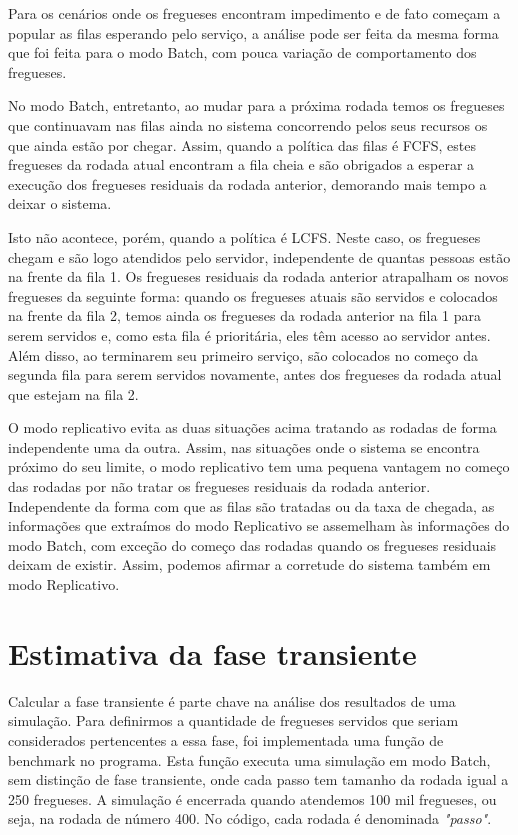 \documentclass[a4paper,10pt]{article}
\begin{document}
    Para os cenários onde os fregueses encontram impedimento e de fato começam a popular as filas esperando pelo serviço, a análise pode ser feita da mesma forma que foi feita para o modo Batch, com pouca variação de comportamento dos fregueses.

    No modo Batch, entretanto, ao mudar para a próxima rodada temos os fregueses que continuavam nas filas ainda no sistema concorrendo pelos seus recursos os que ainda estão por chegar. Assim, quando a política das filas é FCFS, estes fregueses da rodada atual encontram a fila cheia e são obrigados a esperar a execução dos fregueses residuais da rodada anterior, demorando mais tempo a deixar o sistema.

    Isto não acontece, porém, quando a política é LCFS. Neste caso, os fregueses chegam e são logo atendidos pelo servidor, independente de quantas pessoas estão na frente da fila 1. Os fregueses residuais da rodada anterior atrapalham os novos fregueses da seguinte forma: quando os fregueses atuais são servidos e colocados na frente da fila 2, temos ainda os fregueses da rodada anterior na fila 1 para serem servidos e, como esta fila é prioritária,  eles têm acesso ao servidor antes. Além disso, ao terminarem seu primeiro serviço, são colocados no começo da segunda fila para serem servidos novamente, antes dos fregueses da rodada atual que estejam na fila 2.

    O modo replicativo evita as duas situações acima tratando as rodadas de forma independente uma da outra. Assim, nas situações onde o sistema se encontra próximo do seu limite, o modo replicativo tem uma pequena vantagem no começo das rodadas por não tratar os fregueses residuais da rodada anterior. Independente da forma com que as filas são tratadas ou da taxa de chegada, as informações que extraímos do modo Replicativo se assemelham às informações do modo Batch, com exceção do começo das rodadas quando os fregueses residuais deixam de existir. Assim, podemos afirmar a corretude do sistema também em modo Replicativo.


\pagebreak

\section{Estimativa da fase transiente}

    Calcular a fase transiente é parte chave na análise dos resultados de uma simulação. Para definirmos a quantidade de fregueses servidos que seriam considerados pertencentes a essa fase, foi implementada uma função de benchmark no programa. Esta função executa uma simulação em modo Batch, sem distinção de fase transiente, onde cada passo tem tamanho da rodada igual a 250 fregueses. A simulação é encerrada quando atendemos 100 mil fregueses, ou seja, na rodada de número 400. No código, cada rodada é denominada \emph{"passo"}.
\end{document}
